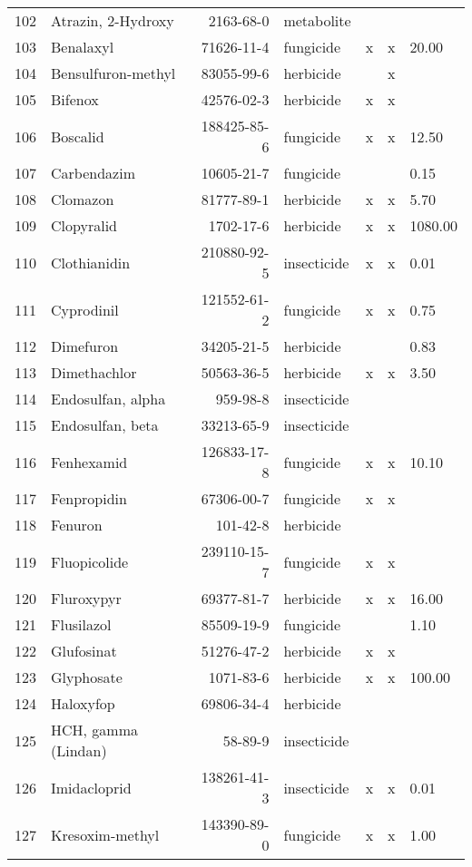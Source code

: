 \begin{longtable}{lp{3cm}rlp{0.5cm}p{0.5cm}p{1cm}}
  102 & Atrazin, 2-Hydroxy & 2163-68-0 & metabolite &  &  &  \\ 
  103 & Benalaxyl & 71626-11-4 & fungicide & x & x & 20.00 \\ 
  104 & Bensulfuron-methyl & 83055-99-6 & herbicide &  & x &  \\ 
  105 & Bifenox & 42576-02-3 & herbicide & x & x &  \\ 
  106 & Boscalid & 188425-85-6 & fungicide & x & x & 12.50 \\ 
  107 & Carbendazim & 10605-21-7 & fungicide &  &  & 0.15 \\ 
  108 & Clomazon & 81777-89-1 & herbicide & x & x & 5.70 \\ 
  109 & Clopyralid & 1702-17-6 & herbicide & x & x & 1080.00 \\ 
  110 & Clothianidin & 210880-92-5 & insecticide & x & x & 0.01 \\ 
  111 & Cyprodinil & 121552-61-2 & fungicide & x & x & 0.75 \\ 
  112 & Dimefuron & 34205-21-5 & herbicide &  &  & 0.83 \\ 
  113 & Dimethachlor & 50563-36-5 & herbicide & x & x & 3.50 \\ 
  114 & Endosulfan, alpha & 959-98-8 & insecticide &  &  &  \\ 
  115 & Endosulfan, beta & 33213-65-9 & insecticide &  &  &  \\ 
  116 & Fenhexamid & 126833-17-8 & fungicide & x & x & 10.10 \\ 
  117 & Fenpropidin & 67306-00-7 & fungicide & x & x &  \\ 
  118 & Fenuron & 101-42-8 & herbicide &  &  &  \\ 
  119 & Fluopicolide & 239110-15-7 & fungicide & x & x &  \\ 
  120 & Fluroxypyr & 69377-81-7 & herbicide & x & x & 16.00 \\ 
  121 & Flusilazol & 85509-19-9 & fungicide &  &  & 1.10 \\ 
  122 & Glufosinat & 51276-47-2 & herbicide & x & x &  \\ 
  123 & Glyphosate & 1071-83-6 & herbicide & x & x & 100.00 \\ 
  124 & Haloxyfop & 69806-34-4 & herbicide &  &  &  \\ 
  125 & HCH, gamma (Lindan) & 58-89-9 & insecticide &  &  &  \\ 
  126 & Imidacloprid & 138261-41-3 & insecticide & x & x & 0.01 \\ 
  127 & Kresoxim-methyl & 143390-89-0 & fungicide & x & x & 1.00 \\ 

\end{longtable}

